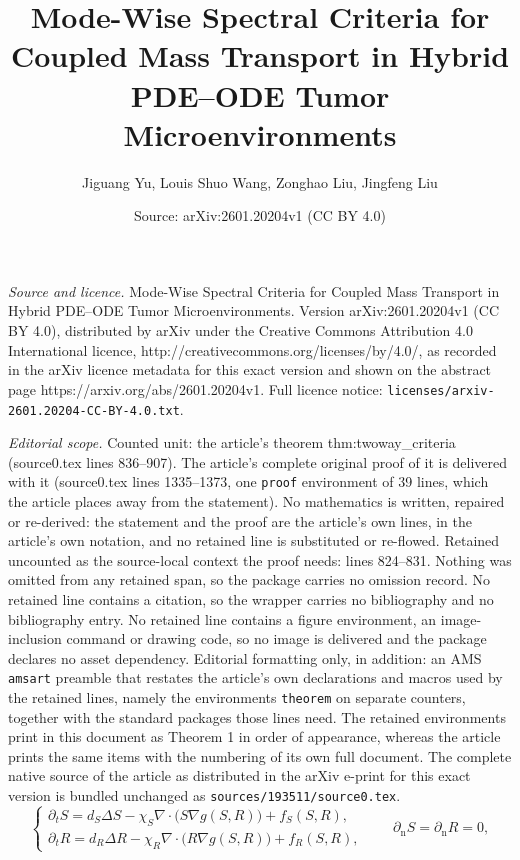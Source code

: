 \documentclass[10pt,a4paper]{amsart}
\title{Mode-Wise Spectral Criteria for Coupled Mass Transport in Hybrid PDE–ODE Tumor Microenvironments}
\author{Jiguang Yu, Louis Shuo Wang, Zonghao Liu, Jingfeng Liu}
\date{Source: arXiv:2601.20204v1 (CC BY 4.0)}
\begin{document}
\maketitle

\noindent\emph{Source and licence.} Mode-Wise Spectral Criteria for Coupled Mass Transport in Hybrid PDE–ODE Tumor Microenvironments. Version arXiv:2601.20204v1 (CC BY 4.0), distributed by arXiv under the Creative Commons Attribution 4.0 International licence, http://creativecommons.org/licenses/by/4.0/, as recorded in the arXiv licence metadata for this exact version and shown on the abstract page https://arxiv.org/abs/2601.20204v1. Full licence notice: \texttt{licenses/arxiv-2601.20204-CC-BY-4.0.txt}.\par\smallskip

\noindent\textit{Editorial scope.} Counted unit: the article's theorem thm:twoway\_criteria (source0.tex lines 836--907). The article's complete original proof of it is delivered with it (source0.tex lines 1335--1373, one \texttt{proof} environment of 39 lines, which the article places away from the statement). No mathematics is written, repaired or re-derived: the statement and the proof are the article's own lines, in the article's own notation, and no retained line is substituted or re-flowed.  Retained uncounted as the source-local context the proof needs: lines 824--831.  Nothing was omitted from any retained span, so the package carries no omission record.  No retained line contains a citation, so the wrapper carries no bibliography and no bibliography entry.  No retained line contains a figure environment, an image-inclusion command or drawing code, so no image is delivered and the package declares no asset dependency.  Editorial formatting only, in addition: an AMS \texttt{amsart} preamble that restates the article's own declarations and macros used by the retained lines, namely the environments \texttt{theorem} on separate counters, together with the standard packages those lines need.  The retained environments print in this document as Theorem 1 in order of appearance, whereas the article prints the same items with the numbering of its own full document.  The complete native source of the article as distributed in the arXiv e-print for this exact version is bundled unchanged as \texttt{sources/193511/source0.tex}.
\begin{equation}
\label{eq:twoway_reduced_g}
\begin{cases}
\partial_t S = d_S\Delta S - \chi_S\nabla\cdot\bigl(S\nabla g(S,R)\bigr) + f_S(S,R),\\[3pt]
\partial_t R = d_R\Delta R - \chi_R\nabla\cdot\bigl(R\nabla g(S,R)\bigr) + f_R(S,R),
\end{cases}
\qquad \partial_{\mathrm n}S=\partial_{\mathrm n}R=0,
\end{equation}
\end{document}
